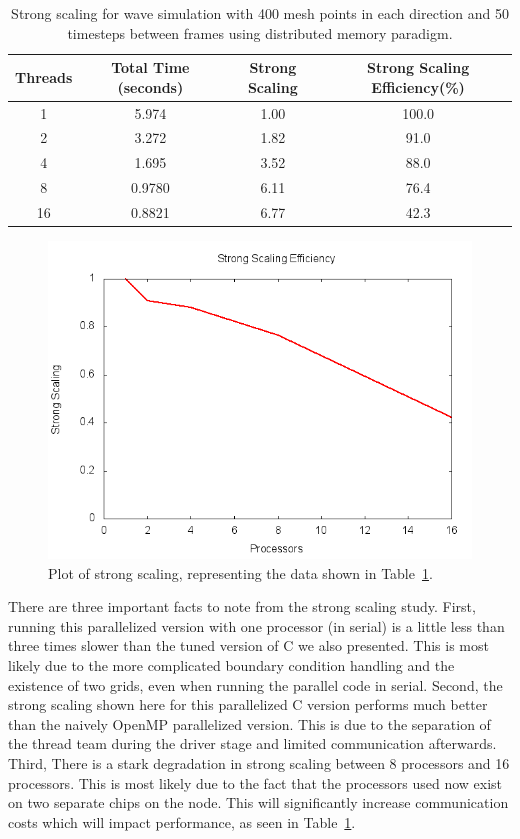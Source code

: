 \documentclass[12pt]{article}
\begin{document}
\begin{table}[h]
	\begin{center}
		\begin{tabular}{|c c c c|}
			\hline
			Threads & Total Time (seconds) & Strong Scaling & Strong Scaling Efficiency(\%) \\ \hline
			1 & 5.974 & 1.00  & 100.0 \\ \hline
			2 & 3.272 & 1.82 &  91.0 \\ \hline
			4 & 1.695 &  3.52&  88.0  \\ \hline
			8 & 0.9780 &  6.11&  76.4  \\ \hline
			16 & 0.8821 & 6.77 &  42.3 \\ \hline
		\end{tabular}
		\caption{Strong scaling for wave simulation with 400 mesh points in each direction and 50 timesteps between frames using distributed memory paradigm.}
		\label{sscale_c_dist}
	\end{center}
\end{table}

\begin{figure}[h]
	\begin{center}
		\includegraphics[width=0.5\columnwidth]{ssplot_c_dist}
		\caption{Plot of strong scaling, representing the data shown in Table~\ref{sscale_c_dist}.}
		\label{ssplot_c_dist}
	\end{center}
\end{figure}

There are three important facts to note from the strong scaling study. First, running this parallelized version with one processor (in serial) is a little less than three times slower than the tuned version of C we also presented. This is most likely due to the more complicated boundary condition handling and the existence of two grids, even when running the parallel code in serial. Second, the strong scaling shown here for this parallelized C version performs much better than the naively OpenMP parallelized version. This is due to the separation of the thread team during the driver stage and limited communication afterwards. Third, There is a stark degradation in strong scaling between 8 processors and 16 processors. This is most likely due to the fact that the processors used now exist on two separate chips on the node. This will significantly increase communication costs which will impact performance, as seen in Table~\ref{sscale_c_dist}. 
\end{document}

